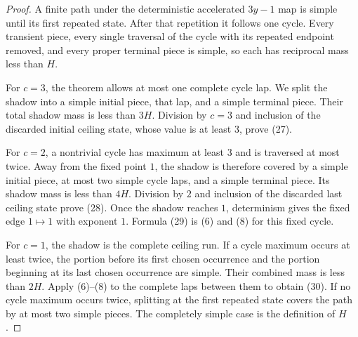 \documentclass[11pt]{article}
\begin{document}
\begin{proof}
A finite path under the deterministic accelerated $3y-1$ map is simple
until its first repeated state.  After that repetition it follows one cycle.
Every transient piece, every single traversal of the cycle with its repeated
endpoint removed, and every proper terminal piece is simple, so each has
reciprocal mass less than $H$.

For $c=3$, the theorem allows at most one complete cycle lap.  We split the
shadow into a simple initial piece, that lap, and a simple terminal piece.
Their total shadow mass is less than $3H$.  Division by $c=3$ and inclusion
of the discarded initial ceiling state, whose value is at least $3$, prove
(27).

For $c=2$, a nontrivial cycle has maximum at least $3$ and is traversed at
most twice.  Away from the fixed point $1$, the shadow is therefore covered
by a simple initial piece, at most two simple cycle laps, and a simple
terminal piece.  Its shadow mass is less than $4H$.  Division by $2$ and
inclusion of the discarded last ceiling state prove (28).  Once the shadow
reaches $1$, determinism gives the fixed edge $1\mapsto1$ with exponent
$1$.  Formula (29) is (6) and (8) for this fixed cycle.

For $c=1$, the shadow is the complete ceiling run.  If a cycle maximum
occurs at least twice, the portion before its first chosen occurrence and
the portion beginning at its last chosen occurrence are simple.  Their
combined mass is less than $2H$.  Apply (6)--(8) to the complete laps
between them to obtain (30).  If no cycle maximum occurs twice, splitting
at the first repeated state covers the path by at most two simple pieces.
The completely simple case is the definition of $H$.
\end{proof}
\end{document}
